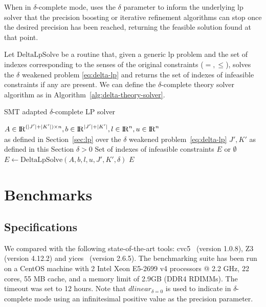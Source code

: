 \documentclass[runningheads]{llncs}
\begin{document}
When in $\delta$-complete mode, \dlinear uses the $\delta$ parameter to inform the underlying \gls{lp} solver that the precision boosting or iterative refinement algorithms can stop once the desired precision has been reached, returning the feasible solution found at that point.

Let $\text{DeltaLpSolve}$ be a routine that, given a generic \gls{lp} problem and the set of indexes corresponding to the senses of the original constraints ($=, \le$), solves the $\delta$ weakened problem \eqref{eq:delta-lp} and returns the set of indexes of infeasible constraints if any are present.
We can define the $\delta$-complete theory solver algorithm as in Algorithm~\ref{alg:delta-theory-solver}.

\begin{algorithm}
    \caption{SMT adapted $\delta$-complete LP solver}\label{alg:delta-theory-solver}
    \begin{algorithmic}
        \Require $A \in {\rm I\!R}^{(|J'| + |K'|) \times n}, b \in {\rm I\!R}^{|J'| + |K'|}, l \in {\rm I\!R}^n, u \in {\rm I\!R}^n$ \\
        \qquad as defined in Section~\ref{sec:lp} over the $\delta$ weakened problem~\eqref{eq:delta-lp}
        \Require $J', K'$ as defined in this Section
        \Require $\delta > 0$
        \Ensure Set of indexes of infeasible constraints $E$ or $\emptyset$
        \State $E \gets \text{DeltaLpSolve}(A, b, l, u, J', K', \delta)$ 
        \State \Return $E$
    \end{algorithmic}
\end{algorithm}

\section{Benchmarks}
\label{sec:benchmarks}
\subsection*{Specifications}

We compared \dlinear with the following state-of-the-art tools: cvc5~\cite{ref:cvc5} (version 1.0.8), Z3~\cite{ref:z3} (version 4.12.2) and yices~\cite{ref:yices} (version 2.6.5).
The benchmarking suite has been run on a CentOS machine with 2 Intel Xeon E5-2699 v4 processors @ 2.2 GHz, 22 cores, 55 MB cache, and a memory limit of 2.9GB (DDR4 RDIMMs).
The timeout was set to 12 hours.
Note that $dlinear_{\delta = 0}$ is used to indicate \dlinear in $\delta$-complete mode using an infinitesimal positive value as the precision parameter.
\end{document}
